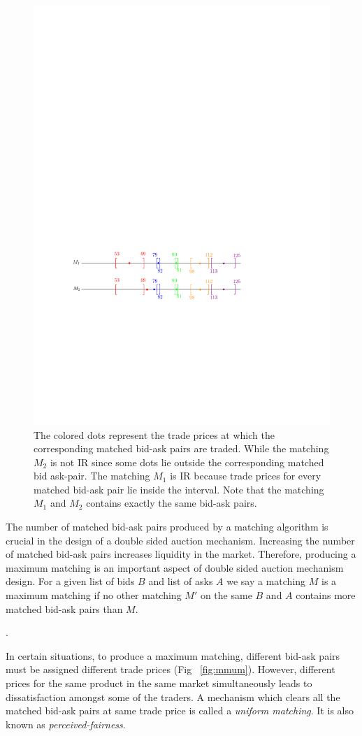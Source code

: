 \documentclass[a4paper,UKenglish,cleveref, autoref]{lipics-v2019}
\begin{document}
\begin{figure}[h!]
\centering
\includegraphics[width=.6\textwidth]{brack_IR.pdf}
\caption{ The colored dots represent the trade prices at which the corresponding matched bid-ask pairs are traded. While the matching $M_2$ is not IR since some dots lie outside the corresponding matched bid ask-pair. The matching $M_1$ is IR because trade prices for every matched bid-ask pair  lie inside the interval. Note that the matching $M_1$ and $M_2$ contains exactly the same bid-ask pairs.}
\label{fig:IR}
\end{figure}

The number of matched bid-ask pairs produced by a matching algorithm is crucial in the design of a double sided auction mechanism. Increasing the number of matched bid-ask pairs increases  liquidity in the market. Therefore, producing a maximum matching is an important aspect of double sided auction mechanism design. For a given list of bids $B$ and list of asks $A$ we say a matching $M$ is  a maximum matching if no other matching $M'$ on the same $B$ and $A$ contains more matched bid-ask pairs than $M$. 

\begin{definition}
.
\end{definition}

In certain situations, to produce a maximum matching, different bid-ask pairs must be assigned different trade prices (Fig ~\ref{fig:mmum}).  However, different prices for the same product in the same market simultaneously leads to dissatisfaction amongst some of the traders. A mechanism which clears all the matched bid-ask pairs at same trade price is called a \emph{uniform matching}. It is also known as \emph{perceived-fairness}. 
\end{document}

